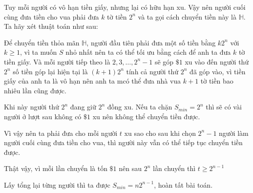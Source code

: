 \documentclass[11pt]{scrartcl}
\begin{document}
\begin{itemize}[label=, leftmargin=0em, itemsep=0.5em]
    \begin{sol}
        Tuy mỗi người có vô hạn tiền giấy, nhưng lại có hữu hạn xu. Vậy nên người cuối cùng đưa tiền cho vua phải đưa $k$ tờ tiền $2^n$ và ta gọi cách chuyển tiền này là $\mathbb{H}$. Ta hãy xét thuật toán như sau:

        Để chuyển tiền thỏa mãn $\mathbb{H}$, người đầu tiên phải đưa một số tiền bằng $k2^n$ với $k \geq 1$, vì ta muốn $S$ nhỏ nhất nên ta có thể tối ưu bằng cách để anh ta đưa $k$ tờ tiền giấy. Và mỗi người tiếp theo là $2,3,\dots,2^{n} - 1$ sẽ góp $\$1$ xu vào đến người thứ $2^n$ số tiền góp lại hiện tại là $(k + 1)2^n$ tính cả người thứ $2^n$ đã góp vào, vì tiền giấy của anh ta là vô hạn nên anh ta mcó thể đưa nhà vua $k + 1$ tờ tiền bao nhiêu lần cũng được.


        Khi này người thứ $2^n$ đang giữ $2^n$ đồng xu. Nếu ta chặn $S_{min} = 2^n$ thì sẽ có vài người ở lượt sau không có $\$1$ xu nên không thể chuyển tiền được.


        Vì vậy nên ta phải đưa cho mỗi người $t$ xu sao cho sau khi chọn $2^{n} - 1$ người làm người cuối cùng đưa tiền cho vua, thì người này vẫn có thể tiếp tục chuyển tiền được.


        Thật vậy, vì mỗi lần chuyển là tốn $\$1$ nên sau $2^{n}$ lần chuyển thì $t \geq 2^{n - 1}$


        Lấy tổng lại từng người thì ta được $S_{min} = n2^{n - 1}$, hoàn tất bài toán.\end{sol}


\end{itemize}
\end{document}
